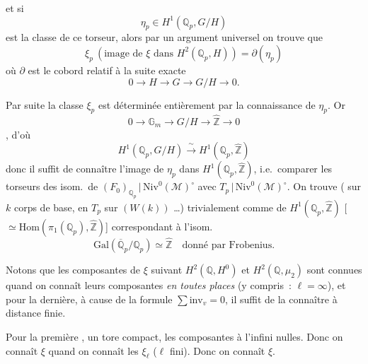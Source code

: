 \documentclass[11pt,a4paper]{article}
\begin{document}
et si
\[
  \eta_p \in H^1(\mathbb{Q}_p, G/H)
\]
est la classe de ce torseur, alors par un argument universel on trouve que
\[
  \xi_p \ (\text{image de } \xi \text{ dans } H^2(\mathbb{Q}_p, H)) = \partial(\eta_p)
\]
où  $\partial$ est le cobord relatif à la suite exacte
\[
  0 \longrightarrow H \longrightarrow G \longrightarrow G/H \longrightarrow 0 .
\]

Par suite la classe $\xi_p$ est déterminée entièrement par la connaissance de $\eta_p$. Or
\[
  0 \longrightarrow \mathbb{G}_m \longrightarrow G/H \longrightarrow \widehat{\mathbb{Z}} \longrightarrow 0
\]
, d'où
\[
  H^1(\mathbb{Q}_p, G/H) \xrightarrow{\;\sim\;} H^1(\mathbb{Q}_p, \widehat{\mathbb{Z}})
\]
donc il suffit de connaître l'image de $\eta_p$ dans $H^1(\mathbb{Q}_p, \widehat{\mathbb{Z}})$, i.e.\ comparer
les torseurs des isom.\ de $(F_0)_{\mathbb{Q}_p} \,|\, \mathrm{Niv}^0(\mathcal{M})^{\circ}$ avec
$T_p \,|\, \mathrm{Niv}^0(\mathcal{M})^{\circ}$. On trouve ( \ill{} sur $k$
corps de base, en \struck{\ill{}} $T_p$ sur \struck{\ill{}} \ill{} $(W(k))$ …) trivialement comme
\struck{\ill{}}  de $H^1(\mathbb{Q}_p, \widehat{\mathbb{Z}})$
[$\simeq \mathrm{Hom}(\pi_1(\mathbb{Q}_p), \widehat{\mathbb{Z}})$] correspondant à l'isom.
\[
  \mathrm{Gal}(\overline{\mathbb{Q}}_p / \mathbb{Q}_p) \simeq \widehat{\mathbb{Z}} \quad \text{donné par Frobenius.}
\]

Notons que les composantes de $\xi$ suivant $H^2(\mathbb{Q}, H^{0})$ et $H^2(\mathbb{Q}, \mu_2)$ sont connues
quand on connaît leurs composantes \emph{en toutes places} (y compris~: $\ell = \infty$), et
 pour la dernière, à cause de la formule $\sum \mathrm{inv}_v = 0$, il suffit de la connaître
à distance finie.

Pour la première , \ill{} un tore compact, les composantes à l'infini \ill{}
nulles. Donc on connaît $\xi$ quand on connaît les $\xi_\ell$ ($\ell$ fini). Donc on connaît $\xi$.
\end{document}
